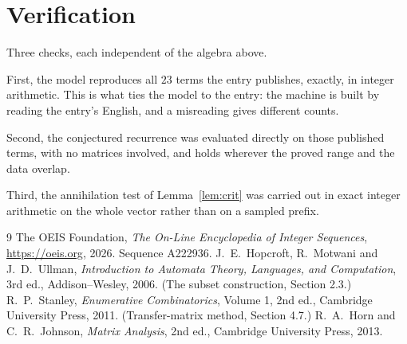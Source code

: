 \documentclass[11pt,a4paper]{article}
\theoremstyle{plain}
\theoremstyle{definition}
\begin{document}
\section{Verification}

Three checks, each independent of the algebra above.

First, the model reproduces all $23$ terms the entry publishes, exactly, in integer
arithmetic. This is what ties the model to the entry: the machine is built by reading the
entry's English, and a misreading gives different counts.

Second, the conjectured recurrence was evaluated directly on those published terms, with no
matrices involved, and holds wherever the proved range and the data overlap.

Third, the annihilation test of Lemma~\ref{lem:crit} was carried out in exact integer
arithmetic on the whole vector rather than on a sampled prefix.

\begin{thebibliography}{9}
 The OEIS Foundation, \emph{The On-Line Encyclopedia of Integer
Sequences}, \url{https://oeis.org}, 2026. Sequence A222936.
 J.~E.~Hopcroft, R.~Motwani and J.~D.~Ullman, \emph{Introduction to Automata
Theory, Languages, and Computation}, 3rd ed., Addison--Wesley, 2006. (The subset
construction, Section 2.3.)
 R.~P.~Stanley, \emph{Enumerative Combinatorics}, Volume 1, 2nd ed.,
Cambridge University Press, 2011. (Transfer-matrix method, Section 4.7.)
 R.~A.~Horn and C.~R.~Johnson, \emph{Matrix Analysis}, 2nd ed., Cambridge
University Press, 2013.
\end{thebibliography}
\end{document}
